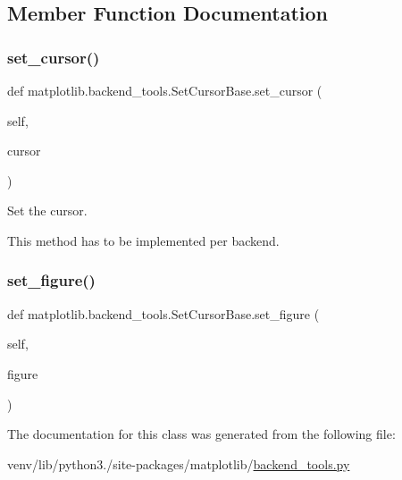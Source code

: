 \subsection{Member Function Documentation}
\mbox{\label{classmatplotlib_1_1backend__tools_1_1SetCursorBase_a8f12fe60eb6b9af48e178635471410fb}} 
\subsubsection{\texorpdfstring{set\+\_\+cursor()}{set\_cursor()}}
{\footnotesize\ttfamily def matplotlib.\+backend\+\_\+tools.\+Set\+Cursor\+Base.\+set\+\_\+cursor (\begin{DoxyParamCaption}\item[{}]{self,  }\item[{}]{cursor }\end{DoxyParamCaption})}

\begin{DoxyVerb}Set the cursor.

This method has to be implemented per backend.
\end{DoxyVerb}
 \mbox{\label{classmatplotlib_1_1backend__tools_1_1SetCursorBase_aca82e3ed1e9c5c9e62bffd3e4bdb6a8b}} 
\subsubsection{\texorpdfstring{set\+\_\+figure()}{set\_figure()}}
{\footnotesize\ttfamily def matplotlib.\+backend\+\_\+tools.\+Set\+Cursor\+Base.\+set\+\_\+figure (\begin{DoxyParamCaption}\item[{}]{self,  }\item[{}]{figure }\end{DoxyParamCaption})}



The documentation for this class was generated from the following file\+:\begin{DoxyCompactItemize}
\item 
venv/lib/python3./site-\/packages/matplotlib/\hyperlink{backend__tools_8py}{backend\+\_\+tools.\+py}\end{DoxyCompactItemize}

